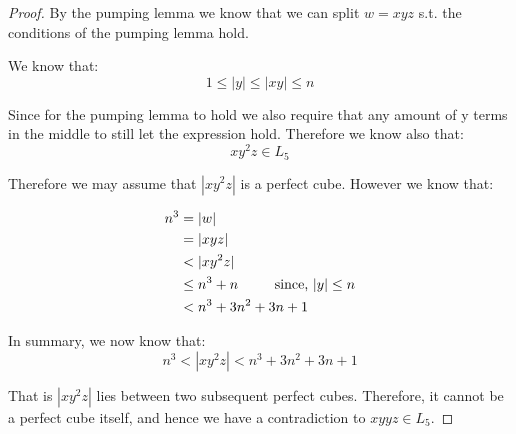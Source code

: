 \begin{enumerate}
\begin{proof}
	By the pumping lemma we know that we can split \( w = xyz \) s.t. the conditions of the pumping lemma hold.
	
	We know that:
	\[
		1 \leq | y | \leq | xy | \leq n
	\]
	
	Since for the pumping lemma to hold we also require that any amount of y terms in the middle to still let the expression hold. Therefore we know also that:
	\[
		xy^2z \in L_5
	\]
	
	Therefore we may assume that \( | xy^2z | \) is a perfect cube.  However we know that:
	
	\begin{align}
		n^3 {}& = | w | \\
		       {}& = | xyz | \\
		       {}& < | xy^2z | \\
		       {}& \leq n^3 + n \hspace*{8mm}\text{ since, } | y | \leq n \\
		       {}& < n^3 + 3n^2 + 3n + 1
	\end{align}
	
	In summary, we now know that:
	\[
		n^3 < | xy^2z | < n^3 + 3n^2 + 3n + 1
	\]
	
	That is \( | xy^2z | \) lies between two subsequent perfect cubes.  Therefore, it cannot be a perfect cube itself, and hence we have a contradiction to \( xyyz \in L_5 \).
	\end{proof}
\end{enumerate}



